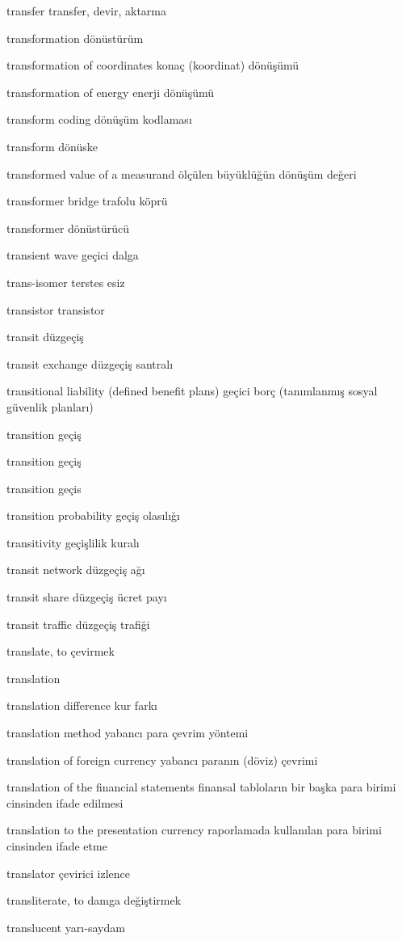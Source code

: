 \documentclass[12pt,fleqn]{article}\usepackage{../../common}
\begin{document}
transfer transfer, devir, aktarma

transformation dönüstürüm

transformation of coordinates konaç (koordinat) dönüşümü

transformation of energy enerji dönüşümü

transform coding dönüşüm kodlaması

transform dönüske

transformed value of a measurand ölçülen büyüklüğün dönüşüm değeri

transformer bridge trafolu köprü

transformer dönüstürücü

transient wave geçici dalga

trans-isomer terstes esiz

transistor transistor

transit düzgeçiş

transit exchange düzgeçiş santralı

transitional liability (defined benefit plans) geçici borç (tanımlanmış sosyal güvenlik planları)

transition geçiş

transition geçiş

transition geçis

transition probability geçiş olasılığı

transitivity geçişlilik kuralı

transit network düzgeçiş ağı

transit share düzgeçiş ücret payı

transit traffic düzgeçiş trafiği

translate, to çevirmek

translation

translation difference kur farkı

translation method yabancı para çevrim yöntemi

translation of foreign currency yabancı paranın (döviz) çevrimi

translation of the financial statements finansal tabloların bir başka para birimi cinsinden ifade edilmesi

translation to the presentation currency raporlamada kullanılan para birimi cinsinden ifade etme

translator çevirici izlence

transliterate, to damga değiştirmek

translucent yarı-saydam
\end{document}
